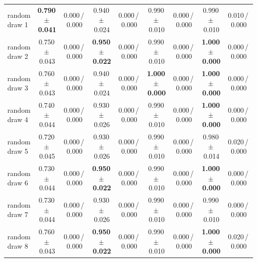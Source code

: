 \begin{tabular}{@{}lcccccccc@{}}
\midrule
random draw 1 & \textbf{0.790\,{\scriptsize$\pm$\,0.041}} & {\scriptsize 0.000\,/\,0.000} & 0.940\,{\scriptsize$\pm$\,0.024} & {\scriptsize 0.000\,/\,0.000} & 0.990\,{\scriptsize$\pm$\,0.010} & {\scriptsize 0.000\,/\,0.000} & 0.990\,{\scriptsize$\pm$\,0.010} & {\scriptsize 0.010\,/\,0.000} \\
random draw 2 & 0.750\,{\scriptsize$\pm$\,0.043} & {\scriptsize 0.000\,/\,0.000} & \textbf{0.950\,{\scriptsize$\pm$\,0.022}} & {\scriptsize 0.000\,/\,0.000} & 0.990\,{\scriptsize$\pm$\,0.010} & {\scriptsize 0.000\,/\,0.000} & \textbf{1.000\,{\scriptsize$\pm$\,0.000}} & {\scriptsize 0.000\,/\,0.000} \\
random draw 3 & 0.760\,{\scriptsize$\pm$\,0.043} & {\scriptsize 0.000\,/\,0.000} & 0.940\,{\scriptsize$\pm$\,0.024} & {\scriptsize 0.000\,/\,0.000} & \textbf{1.000\,{\scriptsize$\pm$\,0.000}} & {\scriptsize 0.000\,/\,0.000} & \textbf{1.000\,{\scriptsize$\pm$\,0.000}} & {\scriptsize 0.000\,/\,0.000} \\
random draw 4 & 0.740\,{\scriptsize$\pm$\,0.044} & {\scriptsize 0.000\,/\,0.000} & 0.930\,{\scriptsize$\pm$\,0.026} & {\scriptsize 0.000\,/\,0.000} & 0.990\,{\scriptsize$\pm$\,0.010} & {\scriptsize 0.000\,/\,0.000} & \textbf{1.000\,{\scriptsize$\pm$\,0.000}} & {\scriptsize 0.000\,/\,0.000} \\
\midrule
random draw 5 & 0.720\,{\scriptsize$\pm$\,0.045} & {\scriptsize 0.000\,/\,0.000} & 0.930\,{\scriptsize$\pm$\,0.026} & {\scriptsize 0.000\,/\,0.000} & 0.990\,{\scriptsize$\pm$\,0.010} & {\scriptsize 0.000\,/\,0.000} & 0.980\,{\scriptsize$\pm$\,0.014} & {\scriptsize 0.020\,/\,0.000} \\
random draw 6 & 0.730\,{\scriptsize$\pm$\,0.044} & {\scriptsize 0.000\,/\,0.000} & \textbf{0.950\,{\scriptsize$\pm$\,0.022}} & {\scriptsize 0.000\,/\,0.000} & 0.990\,{\scriptsize$\pm$\,0.010} & {\scriptsize 0.000\,/\,0.000} & \textbf{1.000\,{\scriptsize$\pm$\,0.000}} & {\scriptsize 0.000\,/\,0.000} \\
random draw 7 & 0.730\,{\scriptsize$\pm$\,0.044} & {\scriptsize 0.000\,/\,0.000} & 0.930\,{\scriptsize$\pm$\,0.026} & {\scriptsize 0.000\,/\,0.000} & 0.990\,{\scriptsize$\pm$\,0.010} & {\scriptsize 0.000\,/\,0.000} & 0.990\,{\scriptsize$\pm$\,0.010} & {\scriptsize 0.000\,/\,0.000} \\
random draw 8 & 0.760\,{\scriptsize$\pm$\,0.043} & {\scriptsize 0.000\,/\,0.000} & \textbf{0.950\,{\scriptsize$\pm$\,0.022}} & {\scriptsize 0.000\,/\,0.000} & 0.990\,{\scriptsize$\pm$\,0.010} & {\scriptsize 0.000\,/\,0.000} & \textbf{1.000\,{\scriptsize$\pm$\,0.000}} & {\scriptsize 0.020\,/\,0.000} \\

\end{tabular}
